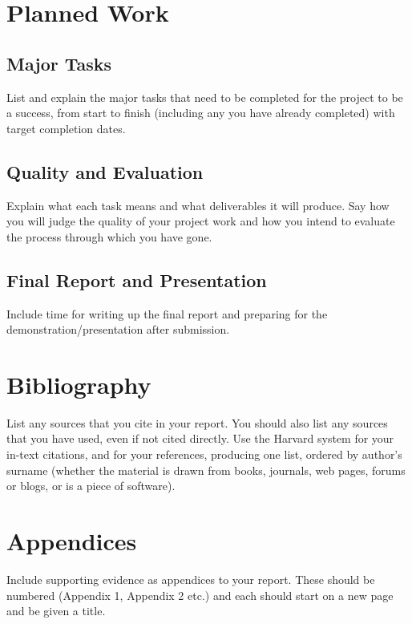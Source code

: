 \documentclass[a4paper,12pt]{article}
\begin{document}
	\section{Planned Work}
	\subsection{Major Tasks}
	List and explain the major tasks that need to be completed for the project to be a success, from start to finish (including any you have already completed) with target completion dates.
	
	\subsection{Quality and Evaluation}
	Explain what each task means and what deliverables it will produce. Say how you will judge the quality of your project work and how you intend to evaluate the process through which you have gone.
	
	\subsection{Final Report and Presentation}
	Include time for writing up the final report and preparing for the demonstration/presentation after submission.
	
	\section{Bibliography}
	List any sources that you cite in your report. You should also list any sources that you have used, even if not cited directly. Use the Harvard system for your in-text citations, and for your references, producing one list, ordered by author’s surname (whether the material is drawn from books, journals, web pages, forums or blogs, or is a piece of software).
	
	\section{Appendices}
	Include supporting evidence as appendices to your report. These should be numbered (Appendix 1, Appendix 2 etc.) and each should start on a new page and be given a title.
	\printbibliography
\end{document}
